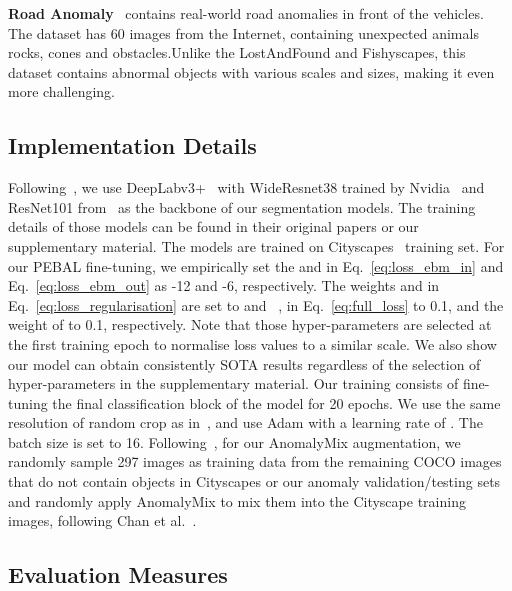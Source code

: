 \documentclass[runningheads]{llncs}
\begin{document}
\noindent \textbf{Road Anomaly}~\cite{lis2019detecting} contains real-world road anomalies in front of the vehicles. The dataset has 60 images from the Internet, containing unexpected animals rocks, cones and obstacles.Unlike the LostAndFound and Fishyscapes, this dataset contains abnormal objects with various scales and sizes, making it even more challenging.  
\vspace{-10pt}
\subsection{Implementation Details}


Following~\cite{chan2021entropy,chan2021segmentmeifyoucan}, we use DeepLabv3+~\cite{chen2018encoder} with WideResnet38 trained by Nvidia~\cite{zhu2019improving} and ResNet101 from~\cite{jung2021standardized} as the backbone of our segmentation models. The training details of those models can be found in their original papers or our supplementary material.
The models are trained on Cityscapes~\cite{cordts2016cityscapes} training set. For our PEBAL fine-tuning, we empirically set the  and  in Eq.~\ref{eq:loss_ebm_in} and Eq.~\ref{eq:loss_ebm_out} as -12 and -6, respectively. The weights  and  in Eq.~\ref{eq:loss_regularisation} are set to  and ~\cite{sultani2018real},  in Eq.~\ref{eq:full_loss} to 0.1, and the weight of  to 0.1, respectively. Note that those hyper-parameters are selected at the first training epoch to normalise loss values to a similar scale. We also show our model can obtain consistently SOTA results regardless of the selection of hyper-parameters in the supplementary material. 
Our training consists of fine-tuning the final classification block of the model for 20 epochs. We use the same resolution of random crop as in~\cite{zhu2019improving}, and use Adam with a learning rate of . The batch size is set to 16. 
Following~\cite{chan2021entropy}, for our AnomalyMix augmentation, we randomly sample 297 images as training data from the remaining COCO images that do not contain objects in Cityscapes or our anomaly validation/testing sets and randomly apply AnomalyMix to mix them into the Cityscape training images, following Chan et al.~\cite{chan2021entropy}.






\vspace{-10pt}
\subsection{Evaluation Measures}
\end{document}
